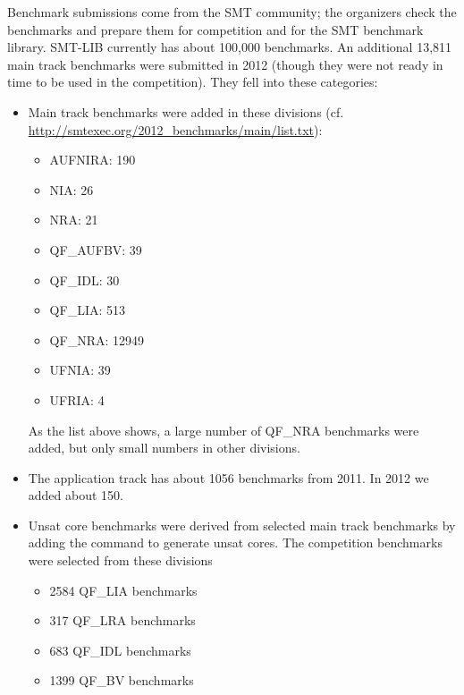 \documentclass[twosize,11pt]{article}
\begin{document}
Benchmark submissions come from the SMT community; the organizers check the benchmarks and prepare them for competition and for the SMT benchmark library.
SMT-LIB currently has about 100,000 benchmarks. An additional 13,811 main track benchmarks were submitted in 2012 (though they were not ready in time to be used in the competition). They fell into these categories:
\begin{itemize}
\item Main track benchmarks were added in these divisions (cf. \url{http://smtexec.org/2012_benchmarks/main/list.txt}):
\begin{itemize}
\item AUFNIRA: 190
\item NIA: 26
\item NRA: 21
\item QF\_AUFBV: 39
\item QF\_IDL: 30
\item QF\_LIA: 513
\item QF\_NRA: 12949
\item UFNIA: 39
\item UFRIA: 4
\end{itemize}
As the list above shows, a large number of QF\_NRA benchmarks were added, but only small numbers in other divisions.
\item The application track has about 1056 benchmarks from 2011. In 2012 we added about 150.
\item Unsat core benchmarks were derived from selected main track benchmarks by adding the command to generate unsat cores. The competition benchmarks were selected from these divisions
\begin{itemize}
\item 2584 QF\_LIA benchmarks
\item  317 QF\_LRA benchmarks
\item  683 QF\_IDL benchmarks
\item 1399 QF\_BV benchmarks
\end{itemize}
\end{itemize}
\end{document}
